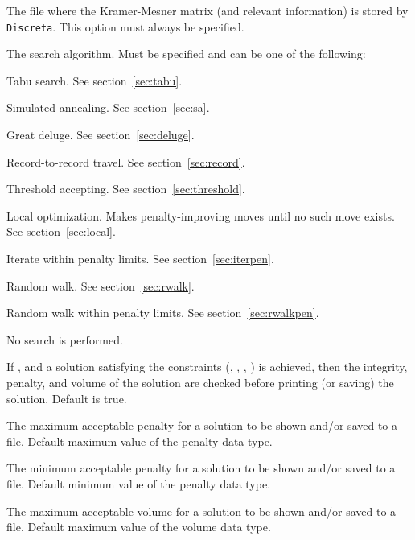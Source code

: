 \documentclass[12pt,a4paper]{article}
\begin{document}
\begin{owndescription}
\item[\Var{discretafile}] The file where the Kramer-Mesner matrix (and
  relevant information) is stored by \texttt{Discreta}. This option
  must always be specified.
\item[\Var{algo}] The search algorithm. Must be specified and can be
  one of the following:
  \begin{owndescription}
  \item[\Val{tabu}] Tabu search. See section~\ref{sec:tabu}.
  \item[\Val{SA}] Simulated annealing. See section~\ref{sec:sa}.
  \item[\Val{deluge}] Great deluge. See section~\ref{sec:deluge}.
  \item[\Val{record}] Record-to-record travel. See
    section~\ref{sec:record}.
  \item[\Val{threshold}] Threshold accepting. See
    section~\ref{sec:threshold}.
  \item[\Val{local}] Local optimization. Makes penalty-improving moves
    until no such move exists. See section~\ref{sec:local}.
  \item[\Val{iterpen}] Iterate within penalty limits. See
    section~\ref{sec:iterpen}.
  \item[\Val{rwalk}] Random walk. See section~\ref{sec:rwalk}.
  \item[\Val{rwalkpen}] Random walk within penalty limits. See
    section~\ref{sec:rwalkpen}.
  \item[\Val{none}] No search is performed.
  \end{owndescription}
\item[\Var{check}] If , and a solution satisfying the
  constraints (, , , )
  is achieved, then the integrity, penalty, and
  volume of the solution are checked before printing (or saving) the
  solution. Default is true.
\item[\Var{maxpen}] The maximum acceptable penalty for a solution to
  be shown and/or saved to a file. Default maximum value of the
  penalty data type.
\item[\Var{minpen}] The minimum acceptable penalty for a solution to
  be shown and/or saved to a file. Default minimum value of the
  penalty data type.
\item[\Var{maxvol}] The maximum acceptable volume for a solution to
  be shown and/or saved to a file. Default maximum value of the
  volume data type.

\end{owndescription}
\end{document}
